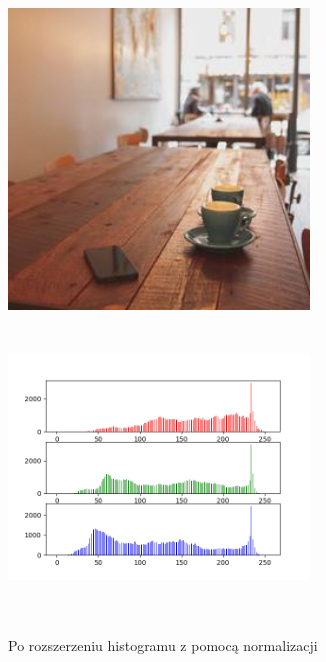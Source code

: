 \documentclass[a4paper,12pt]{book}
\begin{document}
\begin{figure}[H]
	\caption{Po rozszerzeniu histogramu z pomocą normalizacji}
	\includegraphics[width=8cm, height=8cm]{6-3/extend-histogram-image-coffee-dark.png}
	\includegraphics[width=8cm, height=8cm]{6-3/extend-histogram-coffee-dark.png}
\end{figure}
\end{document}
